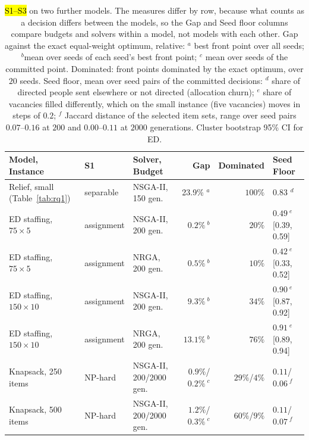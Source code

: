 \documentclass[systems,article,accept,moreauthors,pdftex]{Definitions/mdpi}
\begin{document}
\begin{table}[H]

\caption{\hl{S1--S3} %
 on two further models. The measures differ by row, because what counts as a
decision differs between the models, so the Gap and Seed floor columns compare budgets and
solvers within a model, not models with each other. Gap against the exact equal-weight
optimum, relative: $^a$ best front point over all seeds; $^b$mean over seeds of each seed's best
front point; $^c$ mean over seeds of the committed point. Dominated: front points dominated by
the exact optimum, over $20$ seeds. Seed floor, mean over seed pairs of the committed decisions:
$^d$ share of directed people sent elsewhere or not directed (allocation churn); $^e$ share of
vacancies filled differently, which on the small instance (five vacancies) moves in steps of
$0.2$; $^f$ Jaccard distance of the selected item sets, range over seed pairs $0.07$--$0.16$ at
$200$ and $0.00$--$0.11$ at $2000$ generations. Cluster bootstrap 95\% CI for ED.\label{tab:cases}}
\footnotesize
\setlength{\tabcolsep}{4pt}
\begin{tabularx}{\textwidth}{l l >{\raggedright\arraybackslash}X r r l}
\toprule
\textbf{Model, Instance} & \textbf{S1} & \textbf{Solver, Budget} & \textbf{Gap} & \textbf{Dominated} & \textbf{Seed Floor}\\
\midrule
Relief, small (Table~\ref{tab:rq1}) & separable & NSGA-II, 150 gen. & 23.9\% $^a$ & $100\%$ & 0.83 $^d$\\
ED staffing, $75\times5$ & assignment & NSGA-II, 200 gen. & $0.2\%~^b$ & $20\%$ & $0.49~^e$ [0.39, 0.59]\\
ED staffing, $75\times5$ & assignment & NRGA, 200 gen. & $0.5\%~^b$ & $10\%$ & $0.42~^e$ [0.33, 0.52]\\
ED staffing, $150\times10$ & assignment & NSGA-II, 200 gen. & $9.3\%~^b$ & $34\%$ & $0.90~^e$ [0.87, 0.92]\\
ED staffing, $150\times10$ & assignment & NRGA, 200 gen. & $13.1\%~^b$ & $76\%$ & $0.91~^e$ [0.89, 0.94]\\
Knapsack, 250 items & NP-hard & NSGA-II, 200/2000 gen. & $0.9\%$/$0.2\%~^c$ & $29\%$/$4\%$ & $0.11$/$0.06~^f$\\
Knapsack, 500 items & NP-hard & NSGA-II, 200/2000 gen. & $1.2\%$/$0.3\%~^c$ & $60\%$/$9\%$ & $0.11$/$0.07~^f$\\
\bottomrule
\end{tabularx}
\end{table}
\end{document}
